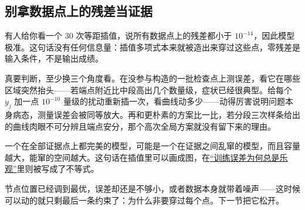 \subsection{别拿数据点上的残差当证据}

有人给你看一个 \(30\) 次等距插值，说所有数据点上的残差都小于 \(10^{-14}\)，因此模型极准。这句话没有任何信息量：插值多项式本来就被造出来穿过这些点，零残差是输入条件，不是输出成绩。

真要判断，至少换三个角度看。在没参与构造的一批检查点上测误差，看它在哪些区域突然抬头——若端点附近比中段高出几个数量级，症状已经很典型。给每个 \(y_j\) 加一点 \(10^{-10}\) 量级的扰动重新插一次，看曲线动多少——动得厉害说明问题本身病态，测量误差会被同等放大。再和更朴素的方案比一比，若分段三次样条给出的曲线肉眼不可分辨且端点安分，那个高次全局方案就没有留下来的理由。

一个在全部证据点上都完美的模型，可能是一个在证据之间乱窜的模型，而且容量越大，能窜的空间越大。这句话在插值里可以画成图，在\hyperref[sec:13-Machine-Learning/10-Learning-Theory/01]{``训练误差为何总是乐观''}里则被写成了不等式。

节点位置已经调到最优，误差却还是不够小，或者数据本身就带着噪声——这时候可以动的就只剩最后一条约束了：为什么非要穿过每个点。下一节把它松开。
